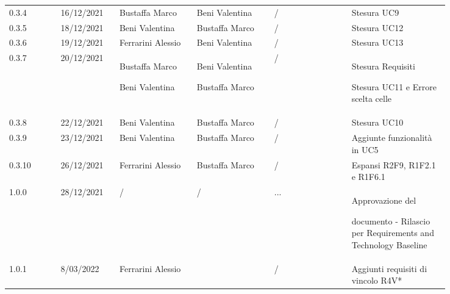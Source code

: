 {\begin{tabular}{p{0.10\linewidth}p{0.10\linewidth}p{0.15\linewidth}p{0.15\linewidth}p{0.15\linewidth}p{0.19\linewidth}}
	\rowcolor[RGB]{233, 245, 206}
	0.3.4 & 16/12/2021 & Bustaffa Marco& Beni Valentina &/& Stesura UC9\\
	\rowcolor[RGB]{216, 235, 171}
	0.3.5 & 18/12/2021 & Beni Valentina& Bustaffa Marco &/& Stesura UC12\\
	\rowcolor[RGB]{233, 245, 206}
	0.3.6 & 19/12/2021 & Ferrarini Alessio& Beni Valentina &/& Stesura UC13\\
	\rowcolor[RGB]{216, 235, 171}
	0.3.7 & 20/12/2021 & Bustaffa Marco \par Beni Valentina & Beni Valentina \par Bustaffa Marco & /& Stesura Requisiti \par Stesura UC11 e Errore scelta celle\\
	\rowcolor[RGB]{233, 245, 206}
	0.3.8 & 22/12/2021 & Beni Valentina& Bustaffa Marco &/& Stesura UC10\\
	\rowcolor[RGB]{216, 235, 171}
	0.3.9 & 23/12/2021 & Beni Valentina& Bustaffa Marco &/& Aggiunte funzionalità in UC5\\
	\rowcolor[RGB]{233, 245, 206}
	0.3.10 & 26/12/2021 & Ferrarini Alessio & Bustaffa Marco &/& Espansi R2F9, R1F2.1 e R1F6.1\\
	\rowcolor[RGB]{216, 235, 171}
	1.0.0 & 28/12/2021 & / & / & ... & Approvazione del \par documento - Rilascio per Requirements and Technology Baseline\\
	\rowcolor[RGB]{233, 245, 206}
	1.0.1 & 8/03/2022 & Ferrarini Alessio &  &/& Aggiunti requisiti di vincolo  R4V*\\
\end{tabular}
}
